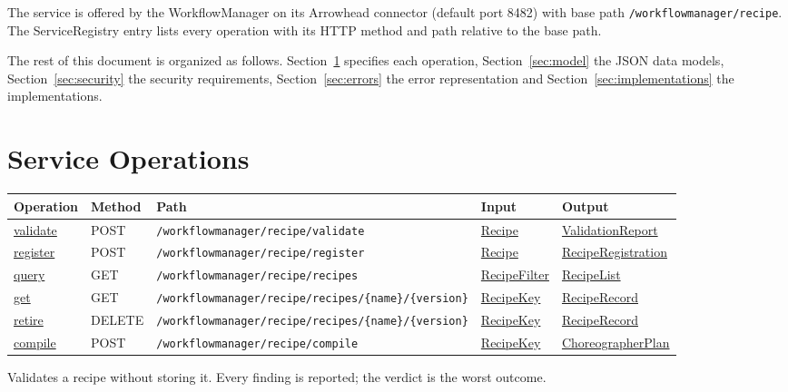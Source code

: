 \documentclass[a4paper]{arrowhead}
\newcommand{\mref}[1]{{\textcolor{ArrowheadPurple}{\hyperref[sec:model:#1]{#1}}}}
\newcommand{\oref}[1]{{\textcolor{ArrowheadBlue}{\hyperref[sec:operations:#1]{#1}}}}
\begin{document}
The service is offered by the WorkflowManager on its Arrowhead connector (default port 8482) with base path \texttt{/\allowbreak{}workflowmanager/\allowbreak{}recipe}.
The ServiceRegistry entry lists every operation with its HTTP method and path relative to the base path.

The rest of this document is organized as follows. Section~\ref{sec:operations} specifies each operation,
Section~\ref{sec:model} the JSON data models, Section~\ref{sec:security} the security requirements,
Section~\ref{sec:errors} the error representation and Section~\ref{sec:implementations} the implementations.

\newpage
\section{Service Operations}
\label{sec:operations}

{\small
\begin{longtable}{|p{3.0cm}|p{1.5cm}|p{5.3cm}|p{3.0cm}|p{3.0cm}|}

\hline
\rowcolor{gray!33} Operation & Method & Path & Input & Output \\ \hline
\endhead
\oref{validate} & POST & \texttt{/\allowbreak{}workflowmanager/\allowbreak{}recipe/\allowbreak{}validate} & \mref{Recipe} & \mref{ValidationReport} \\ \hline
\oref{register} & POST & \texttt{/\allowbreak{}workflowmanager/\allowbreak{}recipe/\allowbreak{}register} & \mref{Recipe} & \mref{RecipeRegistration} \\ \hline
\oref{query} & GET & \texttt{/\allowbreak{}workflowmanager/\allowbreak{}recipe/\allowbreak{}recipes} & \mref{RecipeFilter} & \mref{RecipeList} \\ \hline
\oref{get} & GET & \texttt{/\allowbreak{}workflowmanager/\allowbreak{}recipe/\allowbreak{}recipes/\allowbreak{}\{name\}/\allowbreak{}\{version\}} & \mref{RecipeKey} & \mref{RecipeRecord} \\ \hline
\oref{retire} & DELETE & \texttt{/\allowbreak{}workflowmanager/\allowbreak{}recipe/\allowbreak{}recipes/\allowbreak{}\{name\}/\allowbreak{}\{version\}} & \mref{RecipeKey} & \mref{RecipeRecord} \\ \hline
\oref{compile} & POST & \texttt{/\allowbreak{}workflowmanager/\allowbreak{}recipe/\allowbreak{}compile} & \mref{RecipeKey} & \mref{ChoreographerPlan} \\ \hline
\end{longtable}
}

Validates a recipe without storing it. Every finding is reported; the verdict is the worst outcome.
\end{document}
